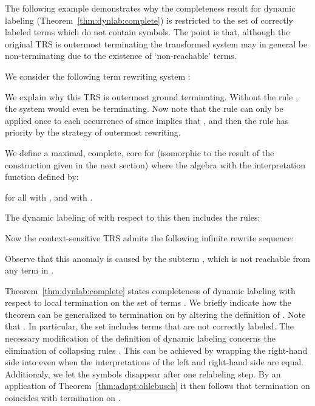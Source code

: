 The following example demonstrates why the completeness result for dynamic labeling (Theorem~\ref{thm:dynlab:complete}) 
is restricted to the set  of correctly labeled terms 
which do not contain  symbols.
The point is that, although the original TRS is outermost terminating
the transformed system may in general be non-terminating 
due to the existence of `non-reachable' terms.
\begin{example}\label{ex:dynlab:noncomplete}
  We consider the following term rewriting system :
  
  We explain why this TRS is outermost ground terminating.
  Without the rule , 
  the system would even be terminating.
  Now note that the rule  can only be applied once 
  to each occurrence of 
  since  implies that ,
  and then the rule  has priority by the strategy of outermost rewriting.

  We define a maximal, complete, core \clabeling{} 
   for 
  (isomorphic to the result of the construction given in the next section) where the algebra  
  with the interpretation function defined by:
  
  for all  with ,
  and with .


  The dynamic labeling  of  with respect to this \clabeling{} then includes the rules:
  
  Now the context-sensitive TRS  
  admits the following infinite rewrite sequence:
  
Observe that this anomaly is caused by the subterm ,
  which is not reachable from any term in .
\end{example}

\begin{remark}
Theorem~\ref{thm:dynlab:complete} 
  states completeness of dynamic labeling with respect to 
  local termination on the set of terms .
We briefly indicate how the theorem can be generalized 
  to termination on 
  by altering the definition of .
  Note that
  .
  In particular,
  the set  includes terms that are not correctly labeled.
  The necessary modification of the definition of dynamic labeling concerns the elimination of collapsing rules .
  This can be achieved by wrapping the right-hand side into 
  even when the interpretations of the left and right-hand side are equal.
  Additionaly, we let the symbols  disappear after one relabeling step.
  By an application of Theorem~\ref{thm:adapt:ohlebusch} it then follows that 
  termination on  
  coincides with termination on .
\end{remark}
